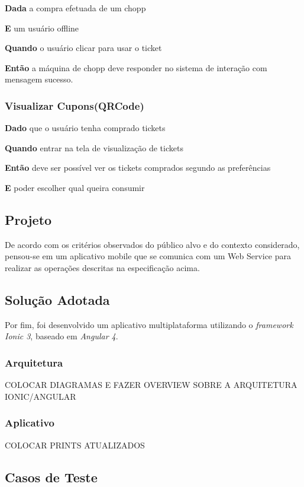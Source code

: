 \textbf{Dada} a compra efetuada de um chopp

\textbf{E} um usuário offline

\textbf{Quando} o usuário clicar para usar o ticket

\textbf{Então} a máquina de chopp deve responder no sistema de interação com mensagem sucesso.

\subsubsection{Visualizar Cupons(QRCode)}

\textbf{Dado} que o usuário tenha comprado tickets

\textbf{Quando} entrar na tela de visualização de tickets

\textbf{Então} deve ser possível ver os tickets comprados segundo as preferências

\textbf{E} poder escolher qual queira consumir

\subsection{Projeto}

De acordo com os critérios observados do público alvo e do contexto considerado, pensou-se em um aplicativo mobile que se comunica com um Web Service para realizar as operações descritas na especificação acima.

\subsection{Solução Adotada}

Por fim, foi desenvolvido um aplicativo multiplataforma utilizando o \textit{framework Ionic 3}, baseado em \textit{Angular 4}.

\subsubsection{Arquitetura}

COLOCAR DIAGRAMAS E FAZER OVERVIEW SOBRE A ARQUITETURA IONIC/ANGULAR

\subsubsection{Aplicativo}

COLOCAR PRINTS ATUALIZADOS

\subsection{Casos de Teste}

